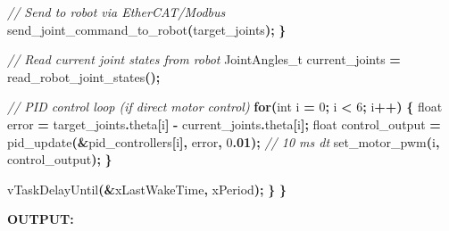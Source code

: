 \documentclass[
]{article}
\newenvironment{Shaded}{\begin{snugshade}}{\end{snugshade}}
\newcommand{\CommentTok}[1]{\textcolor[rgb]{0.56,0.35,0.01}{\textit{#1}}}
\newcommand{\ControlFlowTok}[1]{\textcolor[rgb]{0.13,0.29,0.53}{\textbf{#1}}}
\newcommand{\DataTypeTok}[1]{\textcolor[rgb]{0.13,0.29,0.53}{#1}}
\newcommand{\DecValTok}[1]{\textcolor[rgb]{0.00,0.00,0.81}{#1}}
\newcommand{\ErrorTok}[1]{\textcolor[rgb]{0.64,0.00,0.00}{\textbf{#1}}}
\newcommand{\NormalTok}[1]{#1}
\newcommand{\OperatorTok}[1]{\textcolor[rgb]{0.81,0.36,0.00}{\textbf{#1}}}
\begin{document}
\begin{Shaded}
\begin{Highlighting}[]
            \CommentTok{// Send to robot via EtherCAT/Modbus}
\NormalTok{            send\_joint\_command\_to\_robot}\OperatorTok{(}\NormalTok{target\_joints}\OperatorTok{);}
        \OperatorTok{\}}

        \CommentTok{// Read current joint states from robot}
\NormalTok{        JointAngles\_t current\_joints }\OperatorTok{=}\NormalTok{ read\_robot\_joint\_states}\OperatorTok{();}

        \CommentTok{// PID control loop (if direct motor control)}
        \ControlFlowTok{for}\OperatorTok{(}\DataTypeTok{int}\NormalTok{ i }\OperatorTok{=} \DecValTok{0}\OperatorTok{;}\NormalTok{ i }\OperatorTok{\textless{}} \DecValTok{6}\OperatorTok{;}\NormalTok{ i}\OperatorTok{++)} \OperatorTok{\{}
            \DataTypeTok{float}\NormalTok{ error }\OperatorTok{=}\NormalTok{ target\_joints}\OperatorTok{.}\NormalTok{theta}\OperatorTok{[}\NormalTok{i}\OperatorTok{]} \OperatorTok{{-}}\NormalTok{ current\_joints}\OperatorTok{.}\NormalTok{theta}\OperatorTok{[}\NormalTok{i}\OperatorTok{];}
            \DataTypeTok{float}\NormalTok{ control\_output }\OperatorTok{=}\NormalTok{ pid\_update}\OperatorTok{(\&}\NormalTok{pid\_controllers}\OperatorTok{[}\NormalTok{i}\OperatorTok{],}\NormalTok{ error}\OperatorTok{,} \DecValTok{0}\ErrorTok{.01}\OperatorTok{);}  \CommentTok{// 10 ms dt}
\NormalTok{            set\_motor\_pwm}\OperatorTok{(}\NormalTok{i}\OperatorTok{,}\NormalTok{ control\_output}\OperatorTok{);}
        \OperatorTok{\}}

\NormalTok{        vTaskDelayUntil}\OperatorTok{(\&}\NormalTok{xLastWakeTime}\OperatorTok{,}\NormalTok{ xPeriod}\OperatorTok{);}
    \OperatorTok{\}}
\OperatorTok{\}}
\end{Highlighting}
\end{Shaded}

\textbf{OUTPUT:}
\end{document}
